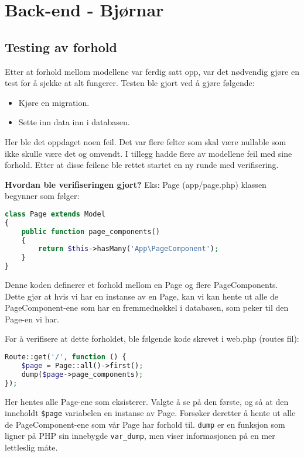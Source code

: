 
\clearpage

\section{Back-end - Bjørnar}

\subsection{Testing av forhold}

Etter at forhold mellom modellene var ferdig satt opp, var det nødvendig gjøre en test for å sjekke at alt fungerer. Testen ble gjort ved å gjøre følgende:

\begin{itemize}
\item Kjøre en migration.
\item Sette inn data inn i databasen.
\end{itemize}

Her ble det oppdaget noen feil. Det var flere felter som skal være nullable som ikke skulle være det og omvendt.
I tillegg hadde flere av modellene feil med sine forhold. Etter at disse feilene ble rettet startet en ny runde med verifisering.

\textbf{Hvordan ble verifiseringen gjort?}
Eks:
Page (app/page.php) klassen begynner som følger:

\begin{lstlisting}[language=PHP]
class Page extends Model
{
    public function page_components()
    {
        return $this->hasMany('App\PageComponent');
    }
}
\end{lstlisting}

Denne koden definerer et forhold mellom en Page og flere PageComponents. Dette gjør at hvis vi har en instanse av en Page, kan vi kan hente ut alle de PageComponent-ene som har en fremmednøkkel i databasen, som peker til den Page-en vi har.

For å verifisere at dette forholdet, ble følgende kode skrevet i web.php (routes fil):

\begin{lstlisting}[language=PHP]
Route::get('/', function () {
    $page = Page::all()->first();
    dump($page->page_components);
});
\end{lstlisting}

Her hentes alle Page-ene som eksisterer. Valgte å se på den første, og så at den inneholdt \lstinline{$page} variabelen en instanse av Page. Forsøker deretter å hente ut alle de PageComponent-ene som vår Page har forhold til. \lstinline{dump} er en funksjon som ligner på PHP sin innebygde \lstinline{var_dump}, men viser informasjonen på en mer lettleslig måte.

